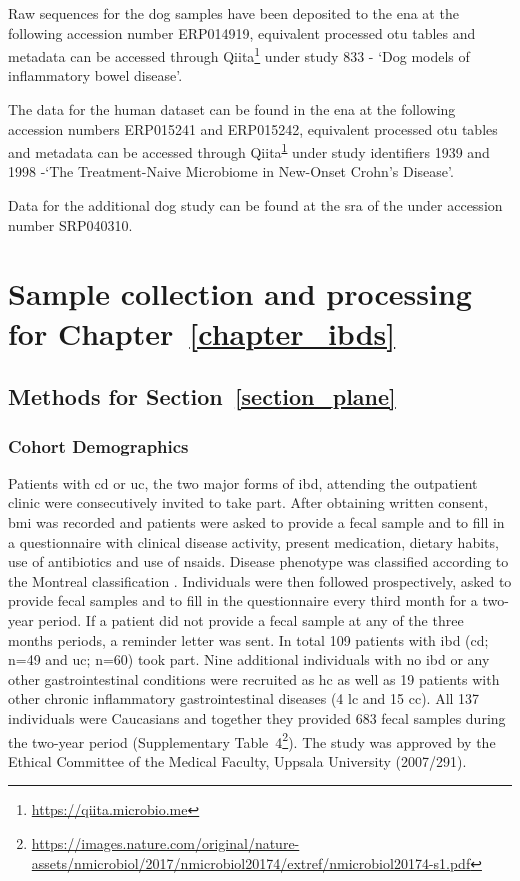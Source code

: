 Raw sequences for the dog samples have been deposited to the \gls{ena} at the 
following accession number ERP014919, equivalent processed \gls{otu} tables and 
metadata can be accessed through 
Qiita\footnote{\label{qiitaurl}\url{https://qiita.microbio.me}} under study 833 
- `Dog models of inflammatory bowel disease'.

The data for the human dataset\cite{RN154} can be found in the \gls{ena} at the 
following accession numbers ERP015241 and ERP015242, equivalent processed 
\gls{otu} tables and metadata can be accessed through 
Qiita\textsuperscript{\ref{qiitaurl}} under study identifiers 1939 and 1998 
-`The Treatment-Naive Microbiome in New-Onset Crohn's Disease'.

Data for the additional dog study \cite{RN153} can be found at the \gls{sra} of 
the under accession number SRP040310.

\chapter{Sample collection and processing for 
Chapter~\ref{chapter_ibds}}\label{appendix_ibds}

\section{Methods for Section~\ref{section_plane}}\label{appendix_plane}

\subsection{Cohort Demographics}

Patients with \gls{cd} or \gls{uc}, the two major forms of \gls{ibd}, attending 
the outpatient clinic were consecutively invited to take part. After obtaining 
written consent, \gls{bmi} was recorded and patients were asked to provide a 
fecal sample and to fill in a questionnaire with clinical disease activity, 
present medication, dietary habits, use of antibiotics and use of 
\glspl{nsaid}. Disease phenotype was classified according to the Montreal 
classification \cite{Silverberg2005}. Individuals were then followed 
prospectively, asked to provide fecal samples and to fill in the questionnaire 
every third month for a two-year period. If a patient did not provide a fecal 
sample at any of the three months periods, a reminder letter was sent. In total 
109 patients with \gls{ibd} (\gls{cd}; n=49 and \gls{uc}; n=60) took part. Nine 
additional individuals with no \gls{ibd} or any other gastrointestinal 
conditions were recruited as \gls{hc} as well as 19 patients with other chronic 
inflammatory gastrointestinal diseases (4 \gls{lc} and 15 \gls{cc}).  All 137 
individuals were Caucasians and together they provided 683 fecal samples during 
the two-year period (Supplementary 
Table~4\footnote{\url{https://images.nature.com/original/nature-assets/nmicrobiol/2017/nmicrobiol20174/extref/nmicrobiol20174-s1.pdf}}).  
The study was approved by the Ethical Committee of the Medical Faculty, Uppsala 
University (2007/291).

